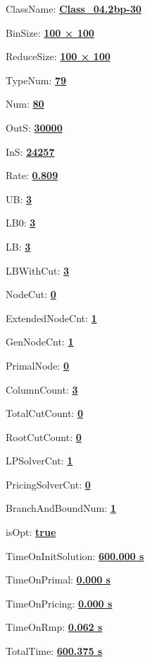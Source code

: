 \documentclass[11pt]{article}
\begin{document}
\pagestyle{empty}


ClassName: \underline{\textbf{Class_04.2bp-30}}
\par
BinSize: \underline{\textbf{100 × 100}}
\par
ReduceSize: \underline{\textbf{100 × 100}}
\par
TypeNum: \underline{\textbf{79}}
\par
Num: \underline{\textbf{80}}
\par
OutS: \underline{\textbf{30000}}
\par
InS: \underline{\textbf{24257}}
\par
Rate: \underline{\textbf{0.809}}
\par
UB: \underline{\textbf{3}}
\par
LB0: \underline{\textbf{3}}
\par
LB: \underline{\textbf{3}}
\par
LBWithCut: \underline{\textbf{3}}
\par
NodeCut: \underline{\textbf{0}}
\par
ExtendedNodeCnt: \underline{\textbf{1}}
\par
GenNodeCnt: \underline{\textbf{1}}
\par
PrimalNode: \underline{\textbf{0}}
\par
ColumnCount: \underline{\textbf{3}}
\par
TotalCutCount: \underline{\textbf{0}}
\par
RootCutCount: \underline{\textbf{0}}
\par
LPSolverCnt: \underline{\textbf{1}}
\par
PricingSolverCnt: \underline{\textbf{0}}
\par
BranchAndBoundNum: \underline{\textbf{1}}
\par
isOpt: \underline{\textbf{true}}
\par
TimeOnInitSolution: \underline{\textbf{600.000 s}}
\par
TimeOnPrimal: \underline{\textbf{0.000 s}}
\par
TimeOnPricing: \underline{\textbf{0.000 s}}
\par
TimeOnRmp: \underline{\textbf{0.062 s}}
\par
TotalTime: \underline{\textbf{600.375 s}}
\par
\newpage
\end{document}
